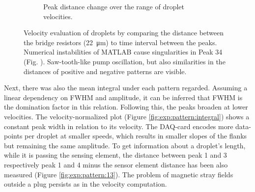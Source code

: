 \begin{figure}[h]
\begin{subfigure}[r]{0.49\textwidth}
		\caption{Peak distance change over the range of droplet velocities.}
		\label{fig:exp:pattern:12:hist}
	\end{subfigure}
	\caption{Velocity evaluation of droplets by comparing the distance between the bridge resistors (\SI{22}{\micro\meter}) to time interval between the peaks. Numerical instabilities of MATLAB cause singularities in Peak 34 (Fig. \protect{}). Saw-tooth-like pump oscillation, but also similarities in the distances of positive and negative patterns are visible.}
	\label{fig:exp:pattern:1234}
\end{figure}
Next, there was also the mean integral under each pattern regarded. Assuming a linear dependency on FWHM and amplitude, it can be inferred that FWHM is the domination factor in this relation. Following this, the peaks broaden at lower velocities. The velocity-normalized plot (Figure \ref{fig:exp:pattern:integral}) shows a constant peak width in relation to its velocity. The DAQ-card encodes more data-points per droplet at smaller speeds, which results in smaller slopes of the flanks but remaining the same amplitude.
\clearpage
To get information about a droplet's length, while it is passing the sensing element, the distance between peak 1 and 3 respectively peak 1 and 4 minus the sensor element distance has been also measured (Figure \ref{fig:exp:pattern:13}). The problem of magnetic stray fields outside a plug persists as in the velocity computation.

